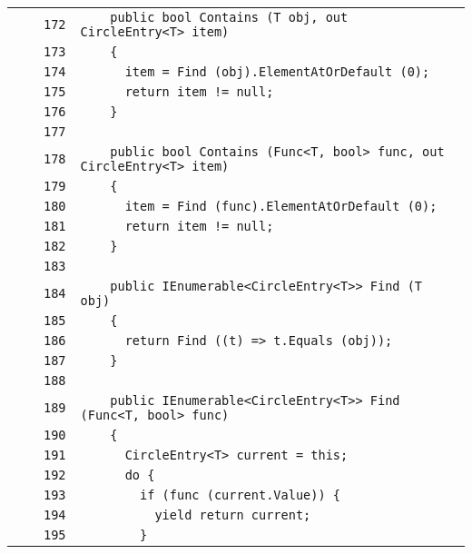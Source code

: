 \documentclass[a4paper,10pt]{article}
\begin{document}
\begin{longtable}[l]{lrrl}
\cellcolor{gray} &  & \verb~172~ & \verb~    public bool Contains (T obj, out CircleEntry<T> item)~\\
\cellcolor{gray} &  & \verb~173~ & \verb~    {~\\
\cellcolor{gray} &  & \verb~174~ & \verb~      item = Find (obj).ElementAtOrDefault (0);~\\
\cellcolor{gray} &  & \verb~175~ & \verb~      return item != null;~\\
\cellcolor{gray} &  & \verb~176~ & \verb~    }~\\
\cellcolor{gray} &  & \verb~177~ & \verb~~\\
\cellcolor{gray} &  & \verb~178~ & \verb~    public bool Contains (Func<T, bool> func, out CircleEntry<T> item)~\\
\cellcolor{gray} &  & \verb~179~ & \verb~    {~\\
\cellcolor{gray} &  & \verb~180~ & \verb~      item = Find (func).ElementAtOrDefault (0);~\\
\cellcolor{gray} &  & \verb~181~ & \verb~      return item != null;~\\
\cellcolor{gray} &  & \verb~182~ & \verb~    }~\\
\cellcolor{gray} &  & \verb~183~ & \verb~~\\
\cellcolor{gray} &  & \verb~184~ & \verb~    public IEnumerable<CircleEntry<T>> Find (T obj)~\\
\cellcolor{gray} &  & \verb~185~ & \verb~    {~\\
\cellcolor{gray} &  & \verb~186~ & \verb~      return Find ((t) => t.Equals (obj));~\\
\cellcolor{gray} &  & \verb~187~ & \verb~    }~\\
\cellcolor{gray} &  & \verb~188~ & \verb~~\\
\cellcolor{gray} &  & \verb~189~ & \verb~    public IEnumerable<CircleEntry<T>> Find (Func<T, bool> func)~\\
\cellcolor{gray} &  & \verb~190~ & \verb~    {~\\
\cellcolor{gray} &  & \verb~191~ & \verb~      CircleEntry<T> current = this;~\\
\cellcolor{gray} &  & \verb~192~ & \verb~      do {~\\
\cellcolor{gray} &  & \verb~193~ & \verb~        if (func (current.Value)) {~\\
\cellcolor{gray} &  & \verb~194~ & \verb~          yield return current;~\\
\cellcolor{gray} &  & \verb~195~ & \verb~        }~\\

\end{longtable}
\end{document}
